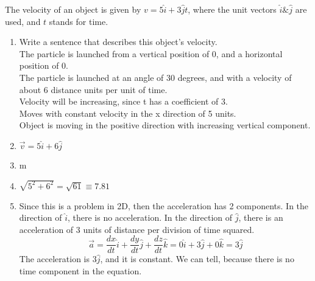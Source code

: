 \documentclass[]{article}
\date{}
\title{\docTitle}
\author{\docAuthor}
\date{\today}
\begin{document}
\maketitle

The velocity of an object is given by $v = 5\hat{i} + 3\hat{j} t$, where the unit vectors $\hat{i} \& \hat{j}$ are used, and $t$ stands for time.
\begin{enumerate}
    \item Write a sentence that describes this object's velocity.\\
    The particle is launched from a vertical position of 0, and a horizontal position of 0.\\
    The particle is launched at an angle of 30 degrees, and with a velocity of about 6 distance units per unit of time.\\
    Velocity will be increasing, since t has a coefficient of 3.\\
    Moves with constant velocity in the x direction of 5 units.\\
    Object is moving in the positive direction with increasing vertical component.
    \item $\vec{v} = 5\hat{i} + 6\hat{j}$
    \item m
    \item $\sqrt{5^2 + 6^2} = \sqrt{61} \equiv 7.81$
    \item Since this is a problem in 2D, then the acceleration has 2 components. In the direction of $\hat{i}$, there is no acceleration. In the direction of $\hat{j}$, there is an acceleration of 3 units of distance per division of time squared.\\
    \begin{equation*}
        \vec{a} = \frac{dx}{dt}\hat{i} + \frac{dy}{dt}\hat{j} + \frac{dz}{dt}\hat{k} = 0\hat{i} + 3\hat{j} + 0\hat{k} = 3\hat{j} 
    \end{equation*}
    The acceleration is $3\hat{j}$, and it is constant. We can tell, because there is no time component in the equation.
\end{enumerate}
\end{document}

